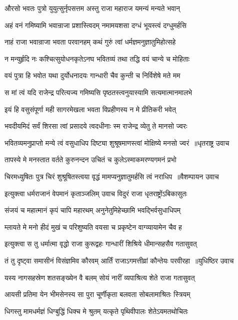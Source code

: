 \twolineshloka
{औरसो भवतः पुत्रो युयुत्सुर्नृपसत्तम}
{अस्तु राजा महाराज यमन्यं मन्यते भवान्}


\twolineshloka
{अहं वनं गमिष्यामि भवान्राजा प्रशास्त्विदम्}
{नमामयशसा दग्धं भूयस्त्वं दग्धुमर्हसि}


\twolineshloka
{नाहं राजा भवान्राजा भवता परवानहम्}
{कथं गुरुं त्वां धर्मज्ञमनुज्ञातुमिहोत्सहे}


\twolineshloka
{न मन्युर्हृदि नः कश्चित्सुयोधनकृतेऽनघ}
{भवितव्यं तथा तद्धि वयं चान्ये च मोहिताः}


\twolineshloka
{वयं पुत्रा हि भवोत यथा दुर्योधनादयः}
{गान्धारी चैव कुन्ती च निर्विशेषे मते मम}


\twolineshloka
{स मां त्वं यदि राजेन्द्र परित्यज्य गमिष्यसि}
{पृष्ठतस्त्वनुयास्यामि सत्यमात्मानमालभे}


\twolineshloka
{इयं हि वसुसंपूर्णा मही सागरमेखला}
{भवता विप्रहीणस्य न मे प्रीतिकरी भवेत्}


\twolineshloka
{भवदीयमिदं सर्वं शिरसा त्वां प्रसादये}
{त्वदधीनाः स्म राजेन्द्र व्येतु ते मानसो ज्वरः}


\threelineshloka
{भवितव्यमनुप्राप्तो मन्ये त्वं वसुधाधिप}
{दिष्ट्या शुश्रूषमाणस्त्वां मोक्षिष्ये मनसो ज्वरं ॥धृतराष्ट्र उवाच}
{}


\twolineshloka
{तापस्ये मे मनस्तात वर्तते कुरुनन्दन}
{उचितं च कुलेऽस्माकमरण्यगमनं प्रभो}


\threelineshloka
{चिरमध्युषितः पुत्र चिरं शुश्रूषितस्त्वया}
{वृद्धं मामप्यनुज्ञातुमर्हसि त्वं नराधिप ॥वैशम्पायन उवाच}
{}


\twolineshloka
{इत्युक्त्वा धर्मराजानं वेपमानं कृताञ्जलिम्}
{उवाच विदुरं राजा धृतराष्ट्रोंऽबिकासुतः}


\twolineshloka
{संजयं च महात्मानं कृपं चापि महारथम्}
{अनुनेतुमिहेच्छामि भवद्भिर्वसुधाधिपम्}


\twolineshloka
{म्लायते मे मनो हीदं मुखं च परिशुष्यति}
{वयसा च प्रकृष्टेन वाग्व्यायामेन चैव ह}


\twolineshloka
{इत्युक्त्वा स तु धर्मात्मा वृद्धो राजा कुरूद्वहः}
{गान्धारीं शिश्रिये धीमान्सहसैव गतासुवत्}


\threelineshloka
{तं तु दृष्ट्वा समासीनं विसंज्ञमिव कौरवम्}
{आर्तिं राजाऽगमत्तीव्रां कौन्तेयः परवीरहा ॥युधिष्ठिर उवाच}
{}


\twolineshloka
{यस्य नागसहस्रेण शतसङ्ख्येन वै बलम्}
{सोयं नारीं व्यपाश्रित्य शेते राजा गतासुवत्}


\twolineshloka
{आयसी प्रतिमा येन भीमसेनस्य सा पुरा}
{चूर्णीकृता बलवता सोबलामाश्रितः स्त्रियम्}


\twolineshloka
{धिगस्तु मामधर्मज्ञं धिग्बुद्धिं धिक्च मे श्रुतम्}
{यत्कृते पृथिवीपालः शेतेऽयमतथोचितः}


